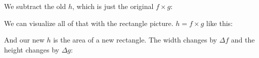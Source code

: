 \documentclass[pdftex, brazil, 12pt, twoside]{article}
\begin{document}
We subtract the old $h$, which is just the original $f \times g$:

\begin{figure}[H]
  \begin{center}
  \end{center}
\end{figure}

We can visualize all of that with the rectangle picture.
$h = f \times g$ like this:

\begin{figure}[H]
  \begin{center}
  \end{center}
\end{figure}

And our new $h$
is the area of a new rectangle.
The width changes by $\Delta f$ and the height changes by $\Delta g$:

\begin{figure}[H]
  \begin{center}
  \end{center}
\end{figure}
\end{document}
